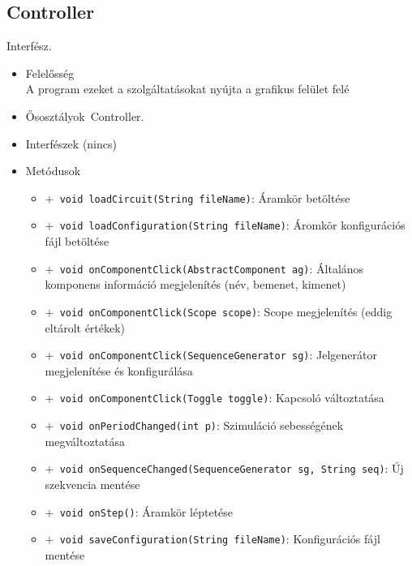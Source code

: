 \subsection{Controller}
Interfész.
\begin{itemize}
\item Felelősség\\
A program ezeket a szolgáltatásokat nyújta a grafikus felület felé
\item Ősosztályok\ Controller.
\item Interfészek (nincs)
\item Metódusok$\ $
\begin{itemize}
	\item[] \texttt{$+$ void loadCircuit(String fileName)}: Áramkör betöltése
	\item[] \texttt{$+$ void loadConfiguration(String fileName)}: Áromkör konfigurációs fájl betöltése
	\item[] \texttt{$+$ void onComponentClick(AbstractComponent ag)}: Általános komponens információ megjelenítés (név, bemenet, kimenet)
	\item[] \texttt{$+$ void onComponentClick(Scope scope)}: Scope megjelenítés (eddig eltárolt értékek)
	\item[] \texttt{$+$ void onComponentClick(SequenceGenerator sg)}: Jelgenerátor megjelenítése és konfigurálása
	\item[] \texttt{$+$ void onComponentClick(Toggle toggle)}: Kapcsoló változtatása
	\item[] \texttt{$+$ void onPeriodChanged(int p)}: Szimuláció sebességének megváltoztatása
	\item[] \texttt{$+$ void onSequenceChanged(SequenceGenerator sg, String seq)}: Új szekvencia mentése
	\item[] \texttt{$+$ void onStep()}: Áramkör léptetése
	\item[] \texttt{$+$ void saveConfiguration(String fileName)}: Konfigurációs fájl mentése
\end{itemize}
\end{itemize}

